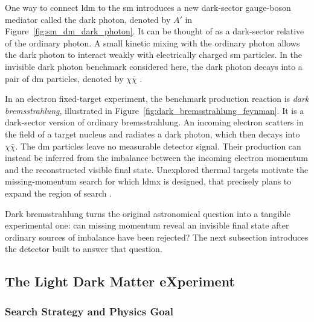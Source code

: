 One way to connect \gls{ldm} to the \gls{sm} introduces
a new dark-sector gauge-boson mediator called the \gls{dark photon}, denoted by \(A'\) in
Figure~\ref{fig:sm_dm_dark_photon}. It can be
thought of as a dark-sector relative of the ordinary photon. A small kinetic mixing with the ordinary
photon allows the dark photon to interact weakly with electrically charged
\gls{sm} particles. In the invisible dark photon benchmark considered here, the dark
photon decays into a pair of \gls{dm} particles, denoted by
\(\chi\bar{\chi}\)
\cite{cirelli2026-darkmatter,ldmx2025-overview}.




In an electron fixed-target experiment, the benchmark production reaction is
\emph{dark bremsstrahlung}, illustrated in
Figure~\ref{fig:dark_bremsstrahlung_feynman}. It is a dark-sector version of
ordinary bremsstrahlung. An incoming electron scatters in the field of a target
nucleus and radiates a dark photon, which then decays into
\(\chi\bar{\chi}\). The \gls{dm} particles leave no measurable detector
signal. Their production can instead be inferred from the imbalance between
the incoming electron momentum and the reconstructed visible final state.
Unexplored thermal targets motivate the missing-momentum search for which
\gls{ldmx} is designed, that precisely plans to expand the region of search
\cite{akesson2018-ldmx,ldmx2025-overview}.

Dark bremsstrahlung turns the original astronomical question into a tangible
experimental one: can missing momentum reveal an invisible final state after
ordinary sources of imbalance have been rejected? The next subsection
introduces the detector built to answer that question.





\subsection{The Light Dark Matter eXperiment}
\label{sec:ldmx}

\subsubsection{Search Strategy and Physics Goal}

